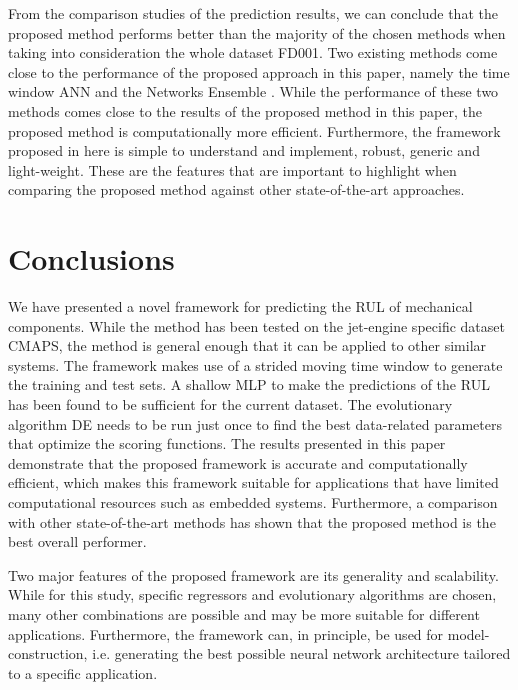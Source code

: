 \documentclass[12pt]{IEEEtran}%
\begin{document}
From the comparison studies of the prediction results, we can conclude that
the proposed method performs better than the majority of the chosen methods
when taking into consideration the whole dataset FD001. Two existing methods
come close to the performance of the proposed approach in this paper, namely
the time window ANN \cite{Lim2016} and the Networks Ensemble \cite{Zhang2016}.
While the performance of these two methods comes close to the results of the
proposed method in this paper, the proposed method is computationally more
efficient. Furthermore, the framework proposed in here is simple to understand
and implement, robust, generic and light-weight. These are the features that
are important to highlight when comparing the proposed method against other
state-of-the-art approaches.

\section{Conclusions}

\label{sec:conclusions}

We have presented a novel framework for predicting the RUL of mechanical
components. While the method has been tested on the jet-engine specific dataset
CMAPS, the method is general enough that it can be applied to other similar
systems. The framework makes use of a strided moving time window to generate
the training and test sets. A shallow MLP to make the predictions of the RUL
has been found to be sufficient for the current dataset. The evolutionary
algorithm DE needs to be run just once to find the best data-related
parameters that optimize the scoring functions. The results presented in this
paper demonstrate that the proposed framework is accurate and computationally
efficient, which makes this framework suitable for applications that have
limited computational resources such as embedded systems. Furthermore, a
comparison with other state-of-the-art methods has shown that the proposed
method is the best overall performer.

Two major features of the proposed framework are its generality and
scalability. While for this study, specific regressors and evolutionary
algorithms are chosen, many other combinations are possible and may be more
suitable for different applications. Furthermore, the framework can, in
principle, be used for model-construction, i.e. generating the best possible
neural network architecture tailored to a specific application.



%
\end{document}
